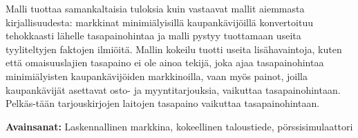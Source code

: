Malli tuottaa samankaltaisia tuloksia kuin vastaavat mallit aiemmasta kirjallisuudesta: markkinat minimiälyisillä
kaupankävijöillä konvertoituu tehokkaasti lähelle tasapainohintaa ja malli pystyy tuottamaan useita tyyliteltyjen 
faktojen ilmiöitä. Mallin kokeilu tuotti useita lisähavaintoja, kuten että omaisuuslajien tasapaino ei ole ainoa tekijä,
joka ajaa tasapainohintaa minimiälyisten kaupankävijöiden markkinoilla, vaan myös painot, joilla kaupankävijät 
asettavat osto- ja myyntitarjouksia, vaikuttaa tasapainohintaan. 
Pelkäs-tään tarjouskirjojen laitojen tasapaino vaikuttaa 
tasapainohintaan.

\textbf{Avainsanat:} Laskennallinen markkina, kokeellinen taloustiede, pörssisimulaattori